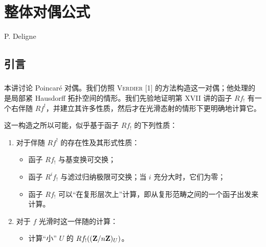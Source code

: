 \chapter{整体对偶公式}
\begin{center}
P. Deligne
\end{center}
\label{sga4.exp.XVIII}

\renewcommand{\sisi}[2]{#2}
\let\Arrowvert\Vert

\setcounter{pageoriginal}{480}
\newcommand{\acorriger}[1]{\nde{#1}}

\setcounter{section}{-1}
\section{引言}\pageoriginale

\subsection{}
本讲讨论 Poincaré 对偶。我们仿照 \textsc{Verdier} [1] 的方法构造这一对偶；他处理的是局部紧 Hausdorff 拓扑空间的情形。我们先验地证明第 XVII 讲的函子 $Rf_{!}$ 有一个右伴随 $Rf^{!}$，并建立其许多性质，然后才在光滑态射的情形下更明确地计算它。

这一构造之所以可能，似乎基于函子 $Rf_{!}$ 的下列性质：
\begin{enumerate}
\renewcommand{\theenumi}{\alph{enumi}}
\renewcommand{\labelenumi}{\theenumi)}
\item 对于伴随 $Rf^{!}$ 的存在性及其形式性质：
\begin{itemize}
\item[(I)] 函子 $Rf_{!}$ 与基变换可交换；

\item[(II)] 函子 $R^{i}f_{!}$ 与滤过归纳极限可交换；当 $i$ 充分大时，它们为零；

\item[(III)] 函子 $Rf_{!}$ 可以“在复形层次上”计算，即从复形范畴之间的一个函子出发来计算。
\end{itemize}

\item 对于 $f$ 光滑时这一伴随的计算：
\begin{itemize}
\item[(IV)] 计算“小” $U$ 的 $Rf_{!}((\mathbf{Z}/n\mathbf{Z})_{U})$。
\end{itemize}
\end{enumerate}

